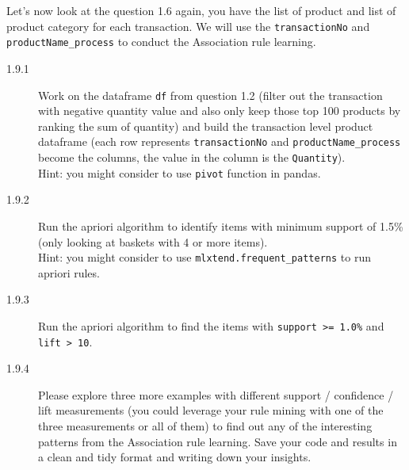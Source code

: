 \documentclass[a4paper]{article}
\begin{document}
    \begin{answer}[Question 1.9]
    Let's now look at the question 1.6 again, you have the list of product and list of product category for each transaction. We will use the \texttt{transactionNo} and \texttt{productName_process} to conduct the Association rule learning.

    \begin{description}
        \item[1.9.1] Work on the dataframe \texttt{df} from question 1.2 (filter out the transaction with negative quantity value and also only keep those top 100 products by ranking the sum of quantity) and build the transaction level product dataframe (each row represents \texttt{transactionNo} and \texttt{productName_process} become the columns, the value in the column is the \texttt{Quantity}). \\
        Hint: you might consider to use \texttt{pivot} function in pandas.
        \item[1.9.2] Run the apriori algorithm to identify items with minimum support of 1.5\% (only looking at baskets with 4 or more items). \\
        Hint: you might consider to use \texttt{mlxtend.frequent_patterns} to run apriori rules.

        \item[1.9.3] Run the apriori algorithm to find the items with \texttt{support >= 1.0\%} and \texttt{lift > 10}.

        \item[1.9.4] Please explore three more examples with different support / confidence / lift measurements (you could leverage your rule mining with one of the three measurements or all of them) to find out any of the interesting patterns from the Association rule learning. Save your code and results in a clean and tidy format and writing down your insights.
    \end{description}
    \end{answer}
\end{document}
